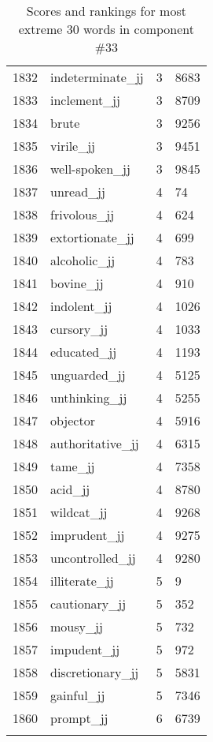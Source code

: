 \begin{longtable}[!htbp]{| rlr@{.}l |}
    1832 & indeterminate\_jj & 3 & 8683 \\
    1833 & inclement\_jj & 3 & 8709 \\
    1834 & brute & 3 & 9256 \\
    1835 & virile\_jj & 3 & 9451 \\
    1836 & well-spoken\_jj & 3 & 9845 \\
    1837 & unread\_jj & 4 & 74 \\
    1838 & frivolous\_jj & 4 & 624 \\
    1839 & extortionate\_jj & 4 & 699 \\
    1840 & alcoholic\_jj & 4 & 783 \\
    1841 & bovine\_jj & 4 & 910 \\
    1842 & indolent\_jj & 4 & 1026 \\
    1843 & cursory\_jj & 4 & 1033 \\
    1844 & educated\_jj & 4 & 1193 \\
    1845 & unguarded\_jj & 4 & 5125 \\
    1846 & unthinking\_jj & 4 & 5255 \\
    1847 & objector & 4 & 5916 \\
    1848 & authoritative\_jj & 4 & 6315 \\
    1849 & tame\_jj & 4 & 7358 \\
    1850 & acid\_jj & 4 & 8780 \\
    1851 & wildcat\_jj & 4 & 9268 \\
    1852 & imprudent\_jj & 4 & 9275 \\
    1853 & uncontrolled\_jj & 4 & 9280 \\
    1854 & illiterate\_jj & 5 & 9 \\
    1855 & cautionary\_jj & 5 & 352 \\
    1856 & mousy\_jj & 5 & 732 \\
    1857 & impudent\_jj & 5 & 972 \\
    1858 & discretionary\_jj & 5 & 5831 \\
    1859 & gainful\_jj & 5 & 7346 \\
    1860 & prompt\_jj & 6 & 6739 \\
    \hline
    \caption{Scores and rankings for most extreme 30 words in component \#33} \\
\end{longtable}
